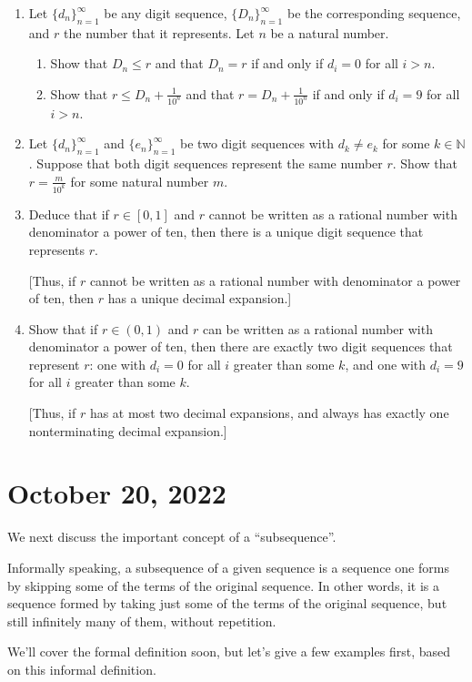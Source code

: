 \documentclass[12pt]{amsart}
\newcommand{\N}{\mathbb{N}}
\numberwithin{equation}{section}
\theoremstyle{plain} %
\newcommand{\Oct}[1]{\section{October #1, 2022}}
\theoremstyle{definition}
\theoremstyle{remark}
\begin{document}
\begin{enumerate}
\begin{enumerate}
\item Let $\{d_n\}_{n=1}^\infty$ be any digit sequence,  $\{ D_n\}_{n=1}^\infty$ be the corresponding sequence, and $r$ the number that it represents. Let $n$ be a natural number.
\begin{enumerate}
\item  Show that $D_n \leq r$ and that $D_n = r$ if and only if $d_{i}=0$ for all $i>n$.
\item Show that $r \leq D_n + \frac{1}{10^n}$ and that $r = D_n + \frac{1}{10^n}$ if and only if $d_{i}=9$ for all $i>n$.
\end{enumerate}
\item Let $\{d_n\}_{n=1}^\infty$ and $\{e_n\}_{n=1}^\infty$ be two digit sequences with $d_k\neq e_k$ for some $k\in \N$. Suppose that both digit sequences represent the same number $r$. Show that $r = \frac{m}{10^k}$ for some natural number $m$.
\item Deduce that if $r\in [0,1]$ and $r$ cannot be written as a rational number with denominator a power of ten, then there is a unique digit sequence that represents $r$.

[Thus, if $r$ cannot be written as a rational number with denominator a power of ten, then $r$ has a unique decimal expansion.]

\item Show that if $r\in (0,1)$ and $r$ can be written as a rational number with denominator a power of ten, then there are exactly two digit sequences that represent $r$: one with $d_i=0$ for all $i$ greater than some $k$, and one with $d_i=9$ for all $i$ greater than some $k$.

[Thus, if $r$ has at most two decimal expansions, and always has exactly one nonterminating decimal expansion.]
\end{enumerate}
\end{enumerate}



\Oct{20}



We next discuss the important concept of a ``subsequence''. 

Informally speaking, a subsequence of a given sequence is a sequence one forms by skipping some of the 
terms of the original sequence. In other words, it is a sequence formed by taking just some of the terms of the original
sequence, but still infinitely many of them,   
without repetition. 

We'll cover the formal definition soon, but let's give a few examples first, based on this informal definition. 
\end{document}
